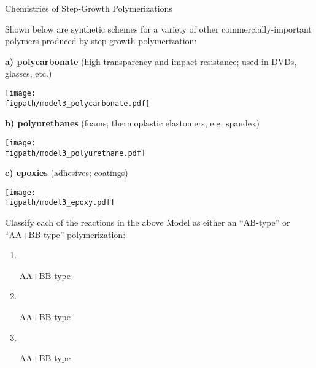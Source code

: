 \begin{activity}{Chemistries of Step-Growth Polymerizations}
\begin{ctqs}
\end{ctqs}

\begin{model}
\label{\labelbase:model:otherstepgrowthchems}

Shown below are synthetic schemes for a variety of other commercially-important polymers produced by step-growth polymerization:

\vspace{0.1in}

\textbf{a) polycarbonate} (high transparency and impact resistance; used in DVDs, glasses, etc.)
		
			\centerline{\texttt{[image: \\figpath/model3\_polycarbonate.pdf]}}

\vspace{0.1in}

\textbf{b) polyurethanes} (foams; thermoplastic elastomers, e.g. spandex)
		
			\centerline{\texttt{[image: \\figpath/model3\_polyurethane.pdf]}}

\vspace{0.1in}

\textbf{c) epoxies} (adhesives; coatings)
		
			\centerline{\texttt{[image: \\figpath/model3\_epoxy.pdf]}}

\end{model}

\vspace{0.25in}
\begin{ctqs}

		\question Classify each of the reactions in the above Model as either an ``AB-type'' or ``AA+BB-type'' polymerization:
		
			\begin{enumerate}
				\item ~ \begin{solution}[0.6in]AA+BB-type\end{solution}
				\item ~ \begin{solution}[0.6in]AA+BB-type\end{solution}
				\item ~ \begin{solution}[0.6in]AA+BB-type\end{solution}
			\end{enumerate}
			
		

\end{ctqs}
\end{activity}
